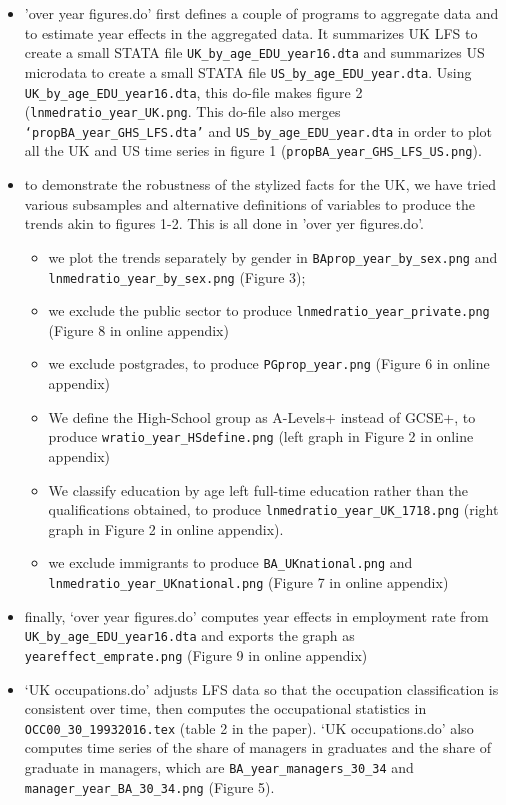 \documentclass[12pt]{article}
\begin{document}
\begin{itemize}
\item	'over year figures.do' first defines a couple of programs to aggregate data and to estimate year effects in the aggregated data. It  summarizes UK LFS to create a small STATA file \texttt{UK\_by\_age\_EDU\_year16.dta} and summarizes US microdata to create a small STATA file \texttt{US\_by\_age\_EDU\_year.dta}. Using  \texttt{UK\_by\_age\_EDU\_year16.dta}, this do-file makes figure 2 (\texttt{lnmedratio\_year\_UK.png}. This do-file also merges  \texttt{‘propBA\_year\_GHS\_LFS.dta’} and  \texttt{US\_by\_age\_EDU\_year.dta} in order to plot all the UK and US time series in figure 1 (\texttt{propBA\_year\_GHS\_LFS\_US.png}).
\item  to demonstrate the robustness of the stylized facts for the UK, we have tried various subsamples and alternative definitions of variables to produce the trends akin to figures 1-2. This is all done in 'over yer figures.do'. 
\begin{itemize}
\item we plot the trends separately by gender in \texttt{BAprop\_year\_by\_sex.png} and \texttt{lnmedratio\_year\_by\_sex.png} (Figure 3);
\item we exclude the public sector to produce \texttt{lnmedratio\_year\_private.png} (Figure 8 in online appendix) 
\item we exclude postgrades, to produce \texttt{PGprop\_year.png} (Figure 6 in online appendix) 
\item We define the High-School group as A-Levels+ instead of GCSE+, to produce \texttt{wratio\_year\_HSdefine.png} (left graph in Figure 2 in online appendix)
\item We classify education by age left full-time education rather than the qualifications obtained, to produce \texttt{lnmedratio\_year\_UK\_1718.png} (right graph in Figure 2 in online appendix).
\item we exclude immigrants to produce \texttt{BA\_UKnational.png} and \texttt{lnmedratio\_year\_UKnational.png} (Figure 7 in online appendix) 
\end{itemize}
\item finally, ‘over year figures.do’ computes year effects in employment rate from \texttt{UK\_by\_age\_EDU\_year16.dta} and exports the graph as \texttt{yeareffect\_emprate.png} (Figure 9 in online appendix)
\\
\item ‘UK occupations.do’ adjusts LFS data so that the occupation classification is consistent over time, then computes the occupational statistics in \texttt{OCC00\_30\_19932016.tex} (table 2 in the paper).  ‘UK occupations.do’ also computes time series of the share of managers in graduates and the share of graduate in managers, which are \texttt{BA\_year\_managers\_30\_34} and \texttt{manager\_year\_BA\_30\_34.png} (Figure 5).

\end{itemize}
\end{document}

